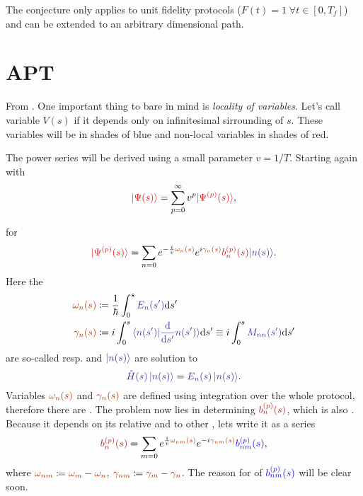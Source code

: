 The conjecture only applies to unit fidelity protocols ($F(t)=1 \;\forall t\in[0,T_f]$) and can be extended to an arbitrary dimensional path.






\section{APT}
From \cite{Rigolin2008}.
One important thing to bare in mind is \emph{locality of variables}. Let's call variable $V(s)$ \emph{} if it depends only on infinitesimal sirrounding of $s$. These variables will be in shades of blue and non-local variables in shades of red.

The power series will be derived using a small parameter $v=1/T$. Starting again with
\begin{equation}
    \red{\ket{\Psi(s)}}=\sum_{p=0}^\infty v^p \red{\ket{\Psi^{(p)}(s)}},
    \label{eq:mainSeries}
\end{equation}

for 
\begin{equation}
    \red{\ket{\Psi^{(p)}(s)}}=\sum_{n=0} e^{-\frac{i}{v} \reddd{\omega_n(s)}}e^{i\reddd{\gamma_n(s)}}\redd{b_n^{(p)}(s)}\bluee{\ket{n(s)}}.
\end{equation}
Here the
\begin{align}
    \reddd{\omega_n(s)} &\coloneqq \frac{1}{\hbar}\int_0^s \bluee{E_n(s')}\d s'\\
    \reddd{\gamma_n(s)} &\coloneqq i\int_0^s \bluee{\braket{n(s')|\frac{\d}{\d s'}n(s')}}\d s' \equiv i\int_0^s \bluee{M_{nn}(s')}\d s'
    \label{eq:gammadef}
\end{align}
are so-called  resp.  and $\bluee{\ket{n(s)}}$ are solution to
\begin{equation}
    \bluee{\HH(s)\ket{n(s)}}=\bluee{E_n(s) \ket{n(s)}}.
\end{equation}
Variables $\reddd{\omega_n(s)}$ and $\reddd{\gamma_n(s)}$ are defined using integration over the whole protocol, therefore there are \emph{}.
The problem now lies in determining $\redd{b_n^{(p)}(s)}$, which is also . Because it depends on its relative  and  to other , lets write it as a series
\begin{equation}
    \redd{b_n^{(p)}(s)}=\sum_{m=0} e^{\frac{i}{v}\reddd{\omega_{nm}(s)}}e^{-i\reddd{\gamma_{nm}(s)}}\blue{b_{nm}^{(p)}(s)},
\end{equation}
where $\reddd{\omega_{nm}} \coloneqq \reddd{\omega_m}-\reddd{\omega_n}$, $\reddd{\gamma_{nm}} \coloneqq \reddd{\gamma_m}-\reddd{\gamma_n}$.  The reason for  of $\blue{b_{nm}^{(p)}(s)}$ will be clear soon.

